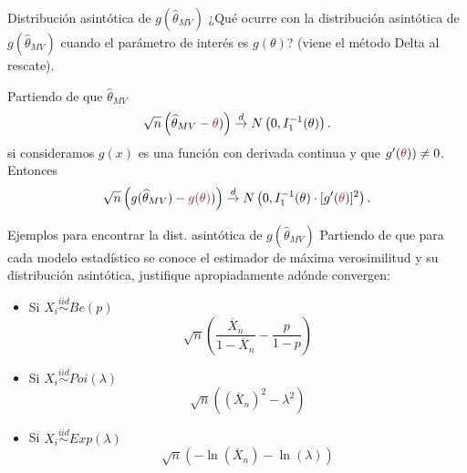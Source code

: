 \documentclass{beamer}
\theoremstyle{definition}
\newcommand{\cw}{\overset{d}{\rightarrow}}
\begin{document}
\begin{frame}{\color{rosee}Distribución asintótica de $g(\widehat{\theta}_{MV})$}
¿Qué ocurre con la distribución asintótica de $g(\widehat{\theta}_{MV})$ cuando el parámetro de interés es  $g(\theta)$? (viene el método Delta al rescate).\medskip

Partiendo de que $\widehat{\theta}_{MV}$ 
    $$
    \sqrt{n} \left( \widehat{\theta}_{MV} - \color{rosee}\theta\color{black}) \right) \cw N\left(0,
    I_1^{-1}(\theta)\right).
    $$
    si consideramos $g(x)$ es una funci\'on con derivada continua y que
    $g^{\prime}(\color{rosee}\theta\color{black}))\neq 0$. Entonces
    \[\sqrt{n} \left( g(\widehat{\theta}_{MV}) - \color{rosee}g(\theta)\color{black}) \right) \cw N\left(0,
    I_1^{-1}(\theta) \cdot [g^{\prime}(\color{rosee}\theta\color{black})]^{2}\right).\]
  
\end{frame}

\begin{frame}{\color{rosee} Ejemplos para encontrar la dist. asintótica de $g(\widehat{\theta}_{MV})$}
Partiendo de que para cada modelo estadístico se conoce el estimador de máxima verosimilitud y su distribución asintótica, justifique apropiadamente adónde convergen:
\begin{itemize}
        \item Si $X_i\stackrel{iid}{\sim}Be(p)$
\[\sqrt{n}\left(\frac{\overline{X}_n}{1-\overline{X}_n}-\frac{p}{1-p}\right)\]
\item Si $X_i\stackrel{iid}{\sim}Poi(\lambda)$
\[\sqrt{n}\left((\overline{X}_n)^2-\lambda^2\right)\]
\item Si $X_i\stackrel{iid}{\sim}Exp(\lambda)$
\[\sqrt{n}\left(-\ln(\overline{X}_n)-\ln(\lambda)\right)\]
\end{itemize}
    
\end{frame}

\end{document}
